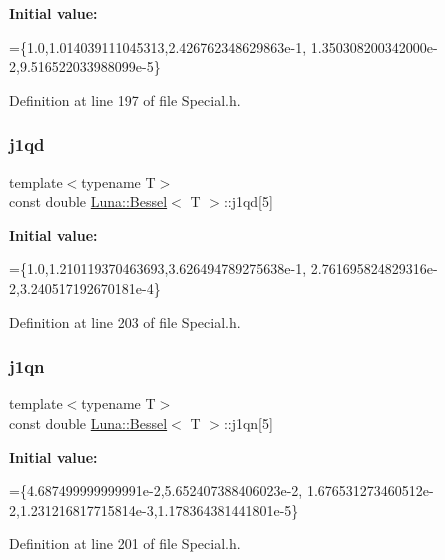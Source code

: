 {\bfseries Initial value\+:}
\begin{DoxyCode}
=\{1.0,1.014039111045313,2.426762348629863e-1,
        1.350308200342000e-2,9.516522033988099e-5\}
\end{DoxyCode}


Definition at line 197 of file Special.\+h.

\mbox{\label{structLuna_1_1Bessel_a28d43c510a489515508fdf18450a280c}} 
\subsubsection{\texorpdfstring{j1qd}{j1qd}}
{\footnotesize\ttfamily template$<$typename T$>$ \\
const double \hyperlink{structLuna_1_1Bessel}{Luna\+::\+Bessel}$<$ T $>$\+::j1qd\mbox{[}5\mbox{]}}

{\bfseries Initial value\+:}
\begin{DoxyCode}
=\{1.0,1.210119370463693,3.626494789275638e-1,
        2.761695824829316e-2,3.240517192670181e-4\}
\end{DoxyCode}


Definition at line 203 of file Special.\+h.

\mbox{\label{structLuna_1_1Bessel_a525e537373d5f47d498981215d270770}} 
\subsubsection{\texorpdfstring{j1qn}{j1qn}}
{\footnotesize\ttfamily template$<$typename T$>$ \\
const double \hyperlink{structLuna_1_1Bessel}{Luna\+::\+Bessel}$<$ T $>$\+::j1qn\mbox{[}5\mbox{]}}

{\bfseries Initial value\+:}
\begin{DoxyCode}
=\{4.687499999999991e-2,5.652407388406023e-2,
        1.676531273460512e-2,1.231216817715814e-3,1.178364381441801e-5\}
\end{DoxyCode}


Definition at line 201 of file Special.\+h.

\mbox{\label{structLuna_1_1Bessel_a836feb9b56c106c385d3eb38324f6b2a}} 
